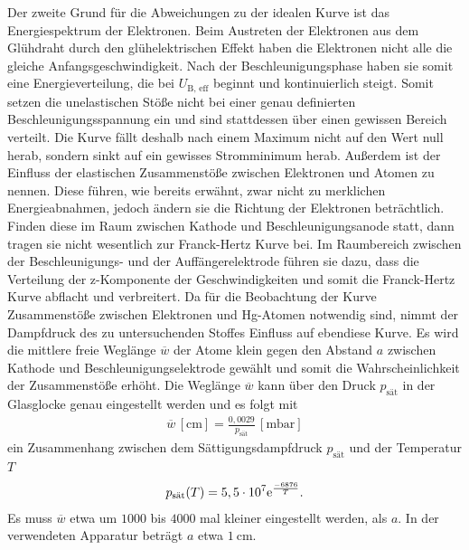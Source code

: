 \noindent
Der zweite Grund für die Abweichungen zu der idealen Kurve ist das Energiespektrum der Elektronen. Beim Austreten der Elektronen aus dem Glühdraht durch den glühelektrischen Effekt haben die Elektronen nicht alle die gleiche Anfangsgeschwindigkeit.
Nach der Beschleunigungsphase haben sie somit eine Energieverteilung, die bei $U_{\text{B, eff}}$ beginnt und kontinuierlich steigt. Somit setzen die unelastischen Stöße nicht bei einer genau definierten Beschleunigungsspannung ein und sind stattdessen über einen gewissen Bereich verteilt.
Die Kurve fällt deshalb nach einem Maximum nicht auf den Wert null herab, sondern sinkt auf ein gewisses Stromminimum herab. \newline
Außerdem ist der Einfluss der elastischen Zusammenstöße zwischen Elektronen und Atomen zu nennen. Diese führen, wie bereits erwähnt, zwar nicht zu merklichen Energieabnahmen, jedoch ändern sie die Richtung der Elektronen beträchtlich.
Finden diese im Raum zwischen Kathode und Beschleunigungsanode statt, dann tragen sie nicht wesentlich zur Franck-Hertz Kurve bei. Im Raumbereich zwischen der Beschleunigungs- und der Auffängerelektrode führen sie dazu, dass die Verteilung der z-Komponente der Geschwindigkeiten und somit die Franck-Hertz Kurve abflacht und verbreitert. \newline
Da für die Beobachtung der Kurve Zusammenstöße zwischen Elektronen und Hg-Atomen notwendig sind, nimmt der Dampfdruck des zu untersuchenden Stoffes Einfluss auf ebendiese Kurve.
Es wird die mittlere freie Weglänge $\overline w$ der Atome klein gegen den Abstand $a$ zwischen Kathode und Beschleunigungselektrode gewählt und somit die Wahrscheinlichkeit der Zusammenstöße erhöht. Die Weglänge $\overline w$ kann über den Druck $p_{\text{sät}}$
in der Glasglocke genau eingestellt werden und es folgt mit
\begin{align*}
    \overline w \, [\si{\centi\meter}] = \frac{0,0029}{p_{\text{sät}}} \, [\si{\milli\bar}]
\end{align*}
ein Zusammenhang zwischen dem Sättigungsdampfdruck $p_{\text{sät}}$ und der Temperatur $T$
\begin{align}
    p_{\text{sät}}(T) = 5,5\cdot 10^{7} \text e^{\frac{-6876}{T}}.
\end{align}
Es muss $\overline w$ etwa um $1000$ bis $4000$ mal kleiner eingestellt werden, als $a$. In der verwendeten Apparatur beträgt $a$ etwa $\SI{1}{\centi\meter}$.